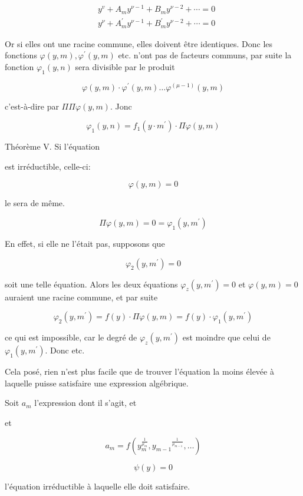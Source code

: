 \documentclass{article}
\begin{document}
\[
\begin{aligned}
& y^{v}+A_{m} y^{\nu-1}+B_{m} y^{\nu-2}+\cdots=0 \\
& y^{\nu}+A_{m}^{\prime} y^{\nu-1}+B_{m}^{\prime} y^{\nu-2}+\cdots=0
\end{aligned}
\]

Or si elles ont une racine commune, elles doivent être identiques. Donc les fonctions \(\varphi(y, m), \varphi^{\prime}(y, m)\) etc. n'ont pas de facteurs communs, par suite la fonction \(\varphi_{1}(y, n)\) sera divisible par le produit

\[
\varphi(y, m) \cdot \varphi^{\prime}(y, m) \ldots \varphi^{(\mu-1)}(y, m)
\]

c'est-à-dire par \(\Pi \Pi \varphi(y, m)\). Jonc

\[
\varphi_{1}(y, n)=f_{1}\left(y \cdot m^{\prime}\right) \cdot \Pi \varphi(y, m)
\]

Théorème V. Si l'équation

est irréductible, celle-ci:

\[
\varphi(y, m)=0
\]

le sera de même.

\[
\Pi \varphi(y, m)=0=\varphi_{1}\left(y, m^{\prime}\right)
\]

En effet, si elle ne l'était pas, supposons que

\[
\varphi_{2}\left(y, m^{\prime}\right)=0
\]

soit une telle équation. Alors les deux équations \(\varphi_{z}\left(y, m^{\prime}\right)=0\) et \(\varphi(y, m)=0\) auraient une racine commune, et par suite

\[
\varphi_{2}\left(y, m^{\prime}\right)=f(y) \cdot \Pi \varphi(y, m)=f(y) \cdot \varphi_{1}\left(y, m^{\prime}\right)
\]

ce qui est impossible, car le degré de \(\varphi_{z}\left(y, m^{\prime}\right)\) est moindre que celui de \(\varphi_{1}\left(y, m^{\prime}\right)\). Donc etc.

Cela posé, rien n'est plus facile que de trouver l'équation la moins élevée à laquelle puisse satisfaire une expression algébrique.

Soit \(a_{m}\) l'expression dont il s'agit, et

et

\[
a_{m}=f\left(y_{m}^{\frac{1}{\mu_{m}}}, y_{m-1}{ }^{\frac{1}{\mu_{m-1}}}, \ldots\right)
\]

\[
\psi(y)=0
\]

l'équation irréductible à laquelle elle doit satisfaire.
\end{document}
